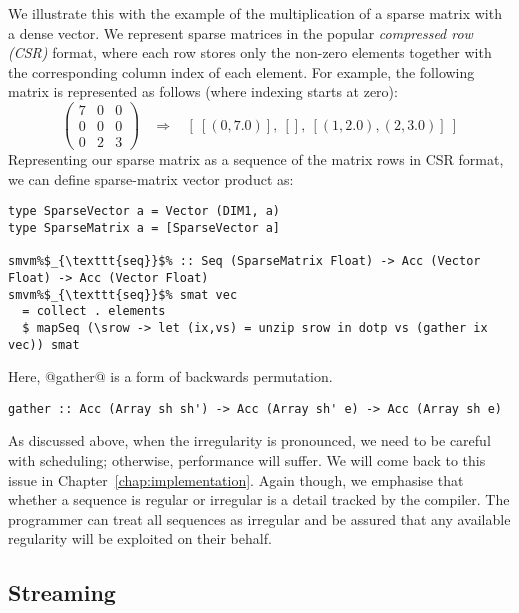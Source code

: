 We illustrate this with the example of the multiplication of a sparse matrix with a dense vector. We represent sparse matrices in the popular \emph{compressed row (CSR)} format, where each row stores only the non-zero elements together with the corresponding column index of each element. For example, the following matrix is represented as follows (where indexing starts at zero):
%
\[
\left(
\begin{array}{ccc}
  7 & 0 & 0 \\
  0 & 0 & 0 \\
  0 & 2 & 3
\end{array} \right)
~~~~ \Rightarrow
~~~~ [~[(0,7.0)],~[],~[(1,2.0),(2,3.0)]~]
\]
%
Representing our sparse matrix as a sequence of the matrix rows in CSR format,
we can define sparse-matrix vector product as:
%
\begin{lstlisting}
type SparseVector a = Vector (DIM1, a)
type SparseMatrix a = [SparseVector a]

smvm%$_{\texttt{seq}}$% :: Seq (SparseMatrix Float) -> Acc (Vector Float) -> Acc (Vector Float)
smvm%$_{\texttt{seq}}$% smat vec
  = collect . elements
  $ mapSeq (\srow -> let (ix,vs) = unzip srow in dotp vs (gather ix vec)) smat
\end{lstlisting}
%
Here, @gather@ is a form of backwards permutation.
%
\begin{lstlisting}
gather :: Acc (Array sh sh') -> Acc (Array sh' e) -> Acc (Array sh e)
\end{lstlisting}

As discussed above, when the irregularity is pronounced, we need to be careful with scheduling; otherwise, performance will suffer. We will come back to this issue in Chapter~\ref{chap:implementation}. Again though, we emphasise that whether a sequence is regular or irregular is a detail tracked by the compiler. The programmer can treat all sequences as irregular and be assured that any available regularity will be exploited on their behalf.

\subsection{Streaming}
\label{sec:streaming}


